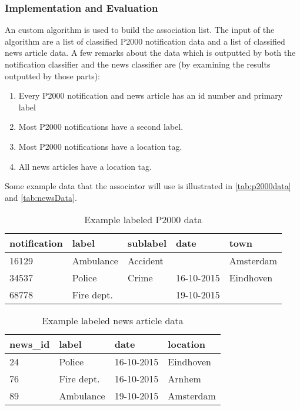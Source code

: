 \subsubsection*{Implementation and Evaluation }
An custom algorithm is used to build the association list. The input of the algorithm are a list of classified P2000 notification data and a list of classified news article data. A few remarks about the data which is outputted by both the notification classifier and the news classifier are (by examining the results outputted by those parts):
\begin{enumerate}
\item Every P2000 notification and news article has an id number and primary label
\item Most P2000 notifications have a second label. 
\item Most P2000 notifications have a location tag.
\item All news articles have a location tag.
\end{enumerate}

Some example data that the associator will use is illustrated in \autoref{tab:p2000data} and \autoref{tab:newsData}. 
\begin{table}[]
\centering
\begin{tabular}{|l|l|l|l|l|}
\hline
\textbf{notification} & \textbf{label} & \textbf{sublabel} & \textbf{date} & \textbf{town} \\ \hline
16129 & Ambulance & Accident & & Amsterdam \\ \hline
34537 & Police & Crime & 16-10-2015 & Eindhoven \\ \hline
68778 & Fire dept. & & 19-10-2015 & \\ \hline
\end{tabular}
\caption{Example labeled P2000 data}
\label{tab:p2000data}
\end{table}

\begin{table}[]
\centering
\begin{tabular}{|l|l|l|l|}
\hline
\textbf{news\_id} & \textbf{label} & \textbf{date} & \textbf{location} \\ \hline
24 & Police & 16-10-2015 & Eindhoven \\ \hline
76 & Fire dept. & 16-10-2015 & Arnhem \\ \hline
89 & Ambulance & 19-10-2015 & Amsterdam \\ \hline
\end{tabular}
\caption{Example labeled news article data}
\label{tab:newsData}
\end{table}

